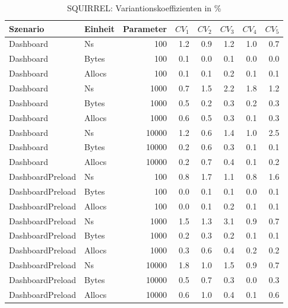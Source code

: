 
\begin{table}[ht]
\setlength{\extrarowheight}{-1pt}
\centering
\caption{SQUIRREL: Variantionskoeffizienten in \%}
\begin{tabular}{llrrrrrr}
\toprule
Szenario & Einheit & Parameter & ${CV_1}$ & ${CV_2}$ & ${CV_3}$& ${CV_4}$ & ${CV_5}$ \\
\midrule
	Dashboard & Ns & 100 &  1.2 &  0.9 &  1.2 &  1.0 &  0.7 \\
	Dashboard & Bytes & 100 &  0.1 &  0.0 &  0.1 &  0.0 &  0.0 \\
	Dashboard & Allocs & 100 &  0.1 &  0.1 &  0.2 &  0.1 &  0.1 \\
	Dashboard & Ns & 1000 &  0.7 &  1.5 & \cellcolor{red!11}  2.2 &  1.8 &  1.2 \\
	Dashboard & Bytes & 1000 &  0.5 &  0.2 &  0.3 &  0.2 &  0.3 \\
	Dashboard & Allocs & 1000 &  0.6 &  0.5 &  0.3 &  0.1 &  0.3 \\
	Dashboard & Ns & 10000 &  1.2 &  0.6 &  1.4 &  1.0 & \cellcolor{red!11}  2.5 \\
	Dashboard & Bytes & 10000 &  0.2 &  0.6 &  0.3 &  0.1 &  0.1 \\
	Dashboard & Allocs & 10000 &  0.2 &  0.7 &  0.4 &  0.1 &  0.2 \\
	DashboardPreload & Ns & 100 &  0.8 &  1.7 &  1.1 &  0.8 &  1.6 \\
	DashboardPreload & Bytes & 100 &  0.0 &  0.1 &  0.1 &  0.0 &  0.1 \\
	DashboardPreload & Allocs & 100 &  0.0 &  0.1 &  0.2 &  0.1 &  0.1 \\
	DashboardPreload & Ns & 1000 &  1.5 &  1.3 & \cellcolor{red!11}  3.1 &  0.9 &  0.7 \\
	DashboardPreload & Bytes & 1000 &  0.2 &  0.3 &  0.2 &  0.1 &  0.1 \\
	DashboardPreload & Allocs & 1000 &  0.3 &  0.6 &  0.4 &  0.2 &  0.2 \\
	DashboardPreload & Ns & 10000 &  1.8 &  1.0 &  1.5 &  0.9 &  0.7 \\
	DashboardPreload & Bytes & 10000 &  0.5 &  0.7 &  0.3 &  0.0 &  0.3 \\
	DashboardPreload & Allocs & 10000 &  0.6 &  1.0 &  0.4 &  0.1 &  0.6 \\
\bottomrule
\end{tabular}
\label{tab:variationskoeffizienten_squirrel}
\end{table}
	